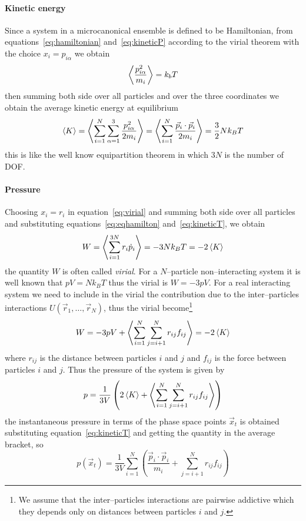 \paragraph{\textbf{Kinetic energy}} Since a system in a microcanonical ensemble is defined to be Hamiltonian, from equations~\eqref{eq:hamiltonian} and~\eqref{eq:kineticP} according to the virial theorem with the choice $x_i = p_{i\alpha}$ we obtain
\begin{equation*}
	\left \langle \frac{p^2_{i\alpha}}{m_i} \right \rangle = k_bT
\end{equation*}
then summing both side over all particles and over the three coordinates we obtain the average kinetic energy at equilibrium
\begin{equation}
	\left \langle K \right \rangle = \left \langle  \sum_{i=1}^{N}\sum_{\alpha=1}^{3}\frac{p_{i\alpha}^2}{2m_i}  \right \rangle = \left \langle \sum_{i=1}^{N}\frac{\vec p_i\cdot \vec p_i}{2m_i} \right \rangle = \frac{3}{2}Nk_B T
	\label{eq:kineticT}
\end{equation}
this is like the well know equipartition theorem in which $3N$ is the number of \ac{DOF}.

\paragraph{\textbf{Pressure}} Choosing $x_i = r_i$ in equation~\eqref{eq:virial} and summing both side over all particles and substituting equations~\eqref{eq:eqhamilton} and~\eqref{eq:kineticT}, we obtain
\begin{equation*}
	W = \left \langle \sum_{i=1}^{3N} r_i\dot p_i \right \rangle = -3Nk_B T = - 2 \left \langle K \right \rangle
\end{equation*}
the quantity $W$ is often called \textit{virial}. For a $N$--particle non--interacting system it is well known that $pV = Nk_B T$ thus the virial is $W = -3pV$. For a real interacting system we need to include in the virial the contribution due to the inter--particles interactions $U(\vec r_1,\dots,\vec r_N)$, thus the virial become\footnote{We assume that the inter--particles interactions are pairwise addictive which they depends only on distances between particles $i$ and $j$.}
\begin{equation*}
	W = -3pV + \left \langle  \sum_{i=1}^N\sum_{j=i+1}^Nr_{ij}f_{ij}  \right \rangle = - 2 \left \langle K \right \rangle
\end{equation*}
where $r_{ij}$ is the distance between particles $i$ and $j$ and $f_{ij}$ is the force between particles $i$ and $j$. Thus the pressure of the system is given by
\begin{equation*}
	p = \frac{1}{3V}\left (2 \left \langle K \right \rangle + \left \langle  \sum_{i=1}^N\sum_{j=i+1}^Nr_{ij}f_{ij}  \right \rangle \right )	
\end{equation*}
the instantaneous pressure in terms of the phase space points $\vec x_t$ is obtained substituting equation~\eqref{eq:kineticT} and getting the quantity in the average bracket, so
\begin{equation}
	p(\vec x_t) = \frac{1}{3V} \sum_{i=1}^{N} \left ( \frac{\vec p_i \cdot \vec p_i}{m_i} +  \sum_{j=i+1}^Nr_{ij}f_{ij}  \right )
	\label{eq:pressure}
\end{equation}

